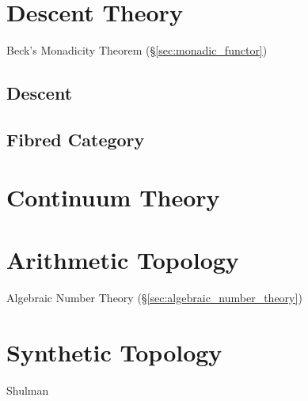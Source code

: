 \section{Descent Theory}\label{sec:descent_theory}

Beck's Monadicity Theorem (\S\ref{sec:monadic_functor})



\subsection{Descent}\label{sec:descent}

\subsection{Fibred Category}\label{sec:fibred_category}



\section{Continuum Theory}\label{sec:continuum_theory}

\section{Arithmetic Topology}\label{sec:arithmetic_topology}

Algebraic Number Theory (\S\ref{sec:algebraic_number_theory})



\section{Synthetic Topology}\label{sec:synthetic_topology}

\fist Shulman
